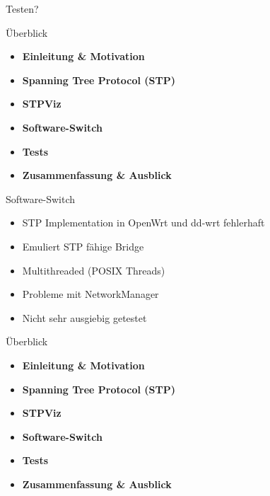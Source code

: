 \documentclass{beamer}
\begin{document}
\begin{frame}{}
    \centering
    \huge \alert{Testen?}
\end{frame}

\begin{frame}{Überblick}
    \begin{itemize}
        \item \textbf{Einleitung \& Motivation}
        \item \textbf{Spanning Tree Protocol (STP)}
        \item \textbf{STPViz}
        \item \alert{\textbf{Software-Switch}}
        \item \textbf{Tests}
        \item \textbf{Zusammenfassung \& Ausblick}
    \end{itemize}
\end{frame}

\begin{frame}{Software-Switch}
    \begin{itemize}[<+->]
        \item STP Implementation in OpenWrt und dd-wrt fehlerhaft
        \item Emuliert STP fähige Bridge
        \item Multithreaded (POSIX Threads)
        \item \alert<7>{Probleme mit NetworkManager}
        \item Nicht sehr ausgiebig getestet
    \end{itemize}
\end{frame}

\begin{frame}{Überblick}
    \begin{itemize}
        \item \textbf{Einleitung \& Motivation}
        \item \textbf{Spanning Tree Protocol (STP)}
        \item \textbf{STPViz}
        \item \textbf{Software-Switch}
        \item \alert{\textbf{Tests}}
        \item \textbf{Zusammenfassung \& Ausblick}
    \end{itemize}
\end{frame}
\end{document}
